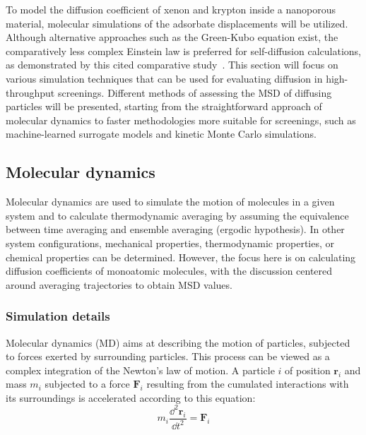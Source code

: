 \documentclass[main]{subfiles}
\begin{document}
To model the diffusion coefficient of xenon and krypton inside a nanoporous material, molecular simulations of the adsorbate displacements will be utilized. Although alternative approaches such as the Green-Kubo equation exist, the comparatively less complex Einstein law is preferred for self-diffusion calculations, as demonstrated by this cited comparative study~\cite{Maginn_2020}. This section will focus on various simulation techniques that can be used for evaluating diffusion in high-throughput screenings. Different methods of assessing the MSD of diffusing particles will be presented, starting from the straightforward approach of molecular dynamics to faster methodologies more suitable for screenings, such as machine-learned surrogate models and kinetic Monte Carlo simulations.

\subsection{Molecular dynamics}

Molecular dynamics are used to simulate the motion of molecules in a given system and to calculate thermodynamic averaging by assuming the equivalence between time averaging and ensemble averaging (ergodic hypothesis). In other system configurations, mechanical properties, thermodynamic properties, or chemical properties can be determined. However, the focus here is on calculating diffusion coefficients of monoatomic molecules, with the discussion centered around averaging trajectories to obtain MSD values.

\subsubsection{Simulation details}

Molecular dynamics (MD) aims at describing the motion of particles, subjected to forces exerted by surrounding particles. This process can be viewed as a complex integration of the Newton's law of motion. A particle $i$ of position $\mathbf{r}_i$ and mass $m_i$ subjected to a force $\mathbf{F}_i$ resulting from the cumulated interactions with its surroundings is accelerated according to this equation:
\begin{equation}\label{eq:newton}
  m_i\frac{\dd^2 \mathbf{r}_i}{{\dd t}^2} = \mathbf{F}_i
\end{equation}
\end{document}
